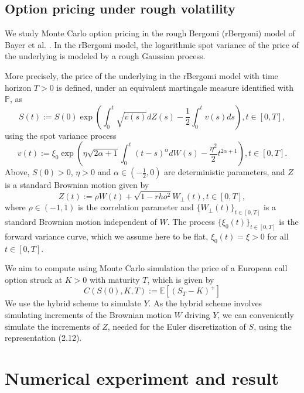 \documentclass[12pt]{article}
\numberwithin{equation}{section}
\begin{document}
\subsection{Option pricing under rough volatility}
        
We study Monte Carlo option pricing in the rough Bergomi (rBergomi) model of Bayer et al. \cite{bayer2015pricing}. In the rBergomi model, the logarithmic spot variance of the price of the underlying is modeled by a rough Gaussian process.

More precisely, the price of the underlying in the rBergomi model with time horizon $T > 0$ is defined, under an equivalent martingale measure identified with $\mathbb{P}$, as
\begin{equation}
  S(t) := S(0) \exp\left(\int_0^t\sqrt{v(s)}dZ(s)-\frac{1}{2}\int_0^tv(s)ds\right), t\in[0,T],
\end{equation}
using the spot variance process
\begin{equation}
  v(t) := \xi_0\exp\left(\eta\sqrt{2\alpha+1}\int_0^t(t-s)^\alpha dW(s) - \frac{\eta^2}{2}t^{2\alpha+1}\right), t\in[0,T].
\end{equation}
Above, $S(0) > 0$, $\eta > 0$ and $\alpha\in(-\frac{1}{2},0)$ are deterministic parameters, and $Z$ is a standard Brownian motion given by
\begin{equation}
  Z(t):=\rho W(t)+ \sqrt{1-rho^2} W_\bot(t), t\in[0,T],
\end{equation}
where $\rho \in (-1,1)$ is the correlation parameter and $\{W_\bot(t)\}_{t\in[0,T]}$ is a standard Brownian motion independent of $W$. The process $\{\xi_0(t)\}_{t\in[0,T]}$ is the forward variance curve, which we assume here to be flat, $\xi_0(t) = \xi > 0$ for all $t \in [0,T]$.

We aim to compute using Monte Carlo simulation the price of a European call option struck at $K > 0$ with maturity $T$, which is given by
\begin{equation}
  C(S(0), K, T) := \mathbb{E} [(S_T - K)^+]
\end{equation}
We use the hybrid scheme to simulate $Y$. As the hybrid scheme involves simulating increments of the Brownian motion $W$ driving $Y$, we can conveniently simulate the increments of $Z$, needed for the Euler discretization of $S$, using the representation (2.12).
      
\section{Numerical experiment and result}
\end{document}
